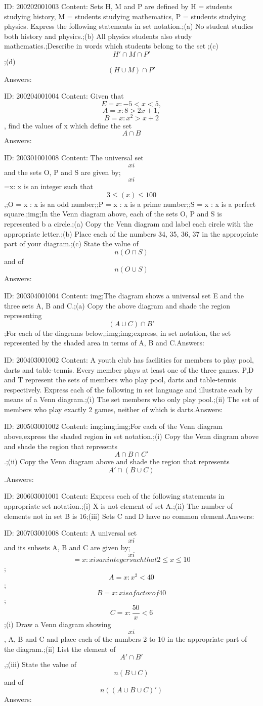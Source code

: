 \documentclass{article}
\begin{document}
ID: 200202001003
Content:
Sets H, M and P are defined by H = {students studying history}, M = {students studying mathematics}, P = {students studying physics}. Express the following statements in set notation.;(a)	No student studies both history and physics.;(b)	All physics students also study mathematics.;Describe in words which students belong to the set ;(c) $$H'\cap  M \cap  P'$$;(d) $$(H \cup  M) \cap  P'$$Answers:

ID: 200204001004
Content:
Given that $$E={x:-5< x<5},$$ $$A={x:8>2x+1},$$ $$B={x:x^2>x+2}$$, find the values of x which define the set $$A \cap B$$Answers:

ID: 200301001008
Content:
The universal set $$xi$$ and the sets O, P and S are given by;$$xi$$={x: x is an integer such that $$3\leq(x)\leq100$$} ,;O = {x : x is an odd number};;P = {x : x is a prime number};;S = {x : x is a perfect square}.;img;In the Venn diagram above, each of the sets O, P and S is represented b a circle.;(a)	Copy the Venn diagram and label each circle with the appropriate letter.;(b)	Place each of the numbers 34, 35, 36, 37 in the appropriate part of your diagram.;(c) State the value of $$n(O \cap S)$$ and of $$n(O \cup S)$$Answers:

ID: 200304001004
Content:
img;The diagram shows a universal set E and the three sets A, B and C.;(a)	Copy the above diagram and shade the region representing $$(A \cup C)\cap B'$$;For each of the diagrams below,;img;img;express, in set notation, the set represented by the shaded area in terms of A, B and C.Answers:

ID: 200403001002
Content:
A youth club has facilities for members to play pool, darts and table-tennis. Every member plays at least one of the three games. P,D and T represent the sets of members who play pool, darts and table-tennis respectively. Express each of the following in set language and illustrate each by means of a Venn diagram.;(i)	The set members who only play pool.;(ii)	The set of members who play exactly 2 games, neither of which is darts.Answers:

ID: 200503001002
Content:
img;img;img;For each of the Venn diagram above,express the shaded region in set notation.;(i) Copy the Venn diagram above and shade the region that represents $$A\cap B\cap C'$$.;(ii) Copy the Venn diagram above and shade the region that represents $$A'\cap (B\cup C)$$.Answers:

ID: 200603001001
Content:
Express each of the following statements in appropriate set notation.;(i)	X is not element of set A.;(ii)	The number of elements not in set B is 16;(iii)	Sets C and D have no common element.Answers:

ID: 200703001008
Content:
A universal set $$xi$$ and its subsets A, B and C are given by;$$xi$$ $$= {x: x is an integer such that 2\leq x\leq10}$$;$$A = {x: x^2<40}$$;$$B={x:x is a factor of 40}$$;$$C={x: \frac{50}{x}<6}$$;(i)	Draw a Venn diagram showing $$xi$$, A, B and C and place each of the numbers 2 to 10 in the appropriate part of the diagram.;(ii)	List the element of $$A' \cap B'$$,;(iii)	State the value of $$n(B \cup C)$$ and of $$n((A \cup B \cup C)')$$Answers:
\end{document}
